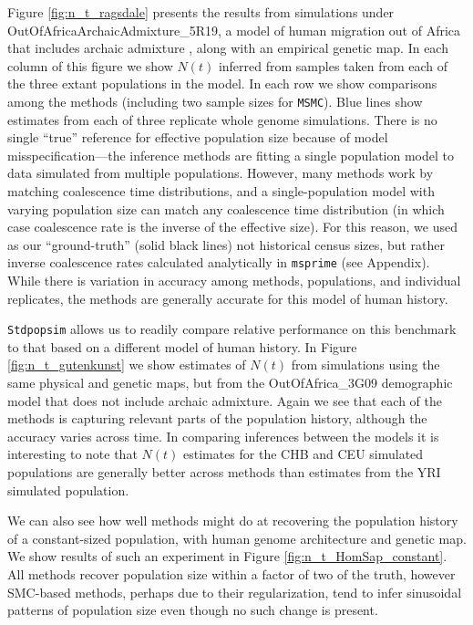 \documentclass[12pt,halfline,a4paper]{ouparticle}
\newcommand{\Stdpopsim}{\texttt{Stdpopsim}\xspace}
\newcommand{\MSMC}{\texttt{MSMC}\xspace}
\begin{document}
Figure \ref{fig:n_t_ragsdale} presents the results 
from simulations under OutOfAfricaArchaicAdmixture\_5R19,
a model of human migration out of Africa that includes archaic admixture 
\citep{ragsdale2019models}, along with an empirical genetic map. In each column of this figure
we show $N(t)$ inferred from samples taken from each of the three extant populations in the model.
In each row we show comparisons among the methods (including two sample sizes for \MSMC).
Blue lines show estimates from each of three replicate whole genome simulations.
There is no single ``true'' reference for effective population size
because of model misspecification---the inference methods are fitting a single population model
to data simulated from multiple populations.
However, many methods work by matching coalescence time distributions,
and a single-population model with varying population size can match any coalescence time distribution
(in which case coalescence rate is the inverse of the effective size).
For this reason, we used as our ``ground-truth'' (solid black lines) 
not historical census sizes,
but rather inverse coalescence rates calculated analytically in \texttt{msprime} (see Appendix).
While there is variation in accuracy among methods, populations, and individual replicates,
the methods are generally accurate for this model of human history.

\Stdpopsim allows us to readily compare relative performance on this benchmark to
that based on a different
model of human history. In Figure \ref{fig:n_t_gutenkunst} we show estimates of
$N(t)$ from simulations using the same physical and genetic maps, but from the OutOfAfrica\_3G09
demographic model that does not include archaic admixture. Again we see that each
of the methods is capturing relevant parts of the population history, although the
accuracy varies across time. In comparing inferences between the
models it is interesting to note that $N(t)$ estimates for the CHB and CEU
simulated populations are generally better across methods than estimates from the YRI
simulated population.

We can also
see how well methods might do at recovering the population history of a constant-sized population,
with human genome architecture and genetic map.
We show results of such an
experiment in Figure \ref{fig:n_t_HomSap_constant}.
All methods recover population size within a factor of two of the truth, however
SMC-based methods, perhaps due to their regularization, tend to infer sinusoidal
patterns of population size even though no such change is present.
\end{document}
